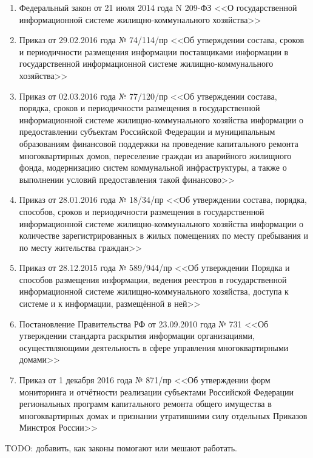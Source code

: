 \begin{enumerate}
	\item Федеральный закон от 21 июля 2014 года N 209-ФЗ <<О государственной информационной системе жилищно-коммунального хозяйства>>
	\item Приказ от 29.02.2016 года № 74/114/пр <<Об утверждении состава, сроков и периодичности размещения информации поставщиками информации в государственной информационной системе жилищно-коммунального хозяйства>>
	\item Приказ от 02.03.2016 года № 77/120/пр <<Об утверждении состава, порядка, сроков и периодичности размещения в государственной информационной системе жилищно-коммунального хозяйства информации о предоставлении субъектам Российской Федерации и муниципальным образованиям финансовой поддержки на проведение капитального ремонта многоквартирных домов, переселение граждан из аварийного жилищного фонда, модернизацию систем коммунальной инфраструктуры, а также о выполнении условий предоставления такой финансово>>
	\item Приказ от 28.01.2016 года № 18/34/пр <<Об утверждении состава, порядка, способов, сроков и периодичности размещения в государственной информационной системе жилищно-коммунального хозяйства информации о количестве зарегистрированных в жилых помещениях по месту пребывания и по месту жительства граждан>>
	\item Приказ от 28.12.2015 года № 589/944/пр <<Об утверждении Порядка и способов размещения информации, ведения реестров в государственной информационной системе жилищно-коммунального хозяйства, доступа к системе и к информации, размещённой в ней>>
	\item Постановление Правительства РФ от 23.09.2010 года № 731 <<Об утверждении стандарта раскрытия информации организациями, осуществляющими деятельность в сфере управления многоквартирными домами>>
	\item Приказ от 1 декабря 2016 года № 871/пр <<Об утверждении форм мониторинга и отчётности реализации субъектами Российской Федерации региональных программ капитального ремонта общего имущества в многоквартирных домах и признании утратившими силу отдельных Приказов Минстроя России>>
\end{enumerate}

TODO: добавить, как законы помогают или мешают работать.

\clearpage
\newpage